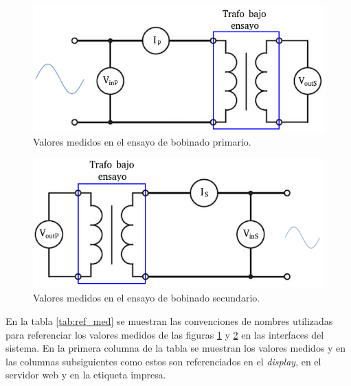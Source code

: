 \begin{figure}[htpb]
	\centering
	\includegraphics[scale=0.7]{./Figures/EnsayoPrimario.png}
	\caption{Valores medidos en el ensayo de bobinado primario.}
	\label{fig:EnsayoPrimario}
\end{figure}

\begin{figure}[htpb]
	\centering
	\includegraphics[scale=0.7]{./Figures/EnsayoSecu.png}
	\caption{Valores medidos en el ensayo de bobinado secundario.}
	\label{fig:EnsayoSecu}
\end{figure}

En la tabla \ref{tab:ref_med} se muestran las convenciones de nombres utilizadas para referenciar los valores medidos de las figuras \ref{fig:EnsayoPrimario} y \ref{fig:EnsayoSecu} en las interfaces del sistema. En la primera columna de la tabla se muestran los valores medidos y en las columnas subsiguientes como estos son referenciados en el \textit{display}, en el servidor web y en la etiqueta impresa. 

